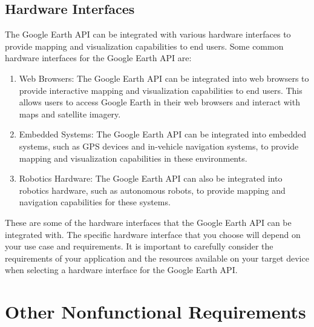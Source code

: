 \subsection{Hardware Interfaces}
The Google Earth API can be integrated with various hardware interfaces to provide mapping and visualization capabilities to end users. Some common hardware interfaces for the Google Earth API are:
\begin{enumerate}
\item Web Browsers: The Google Earth API can be integrated into web browsers to provide interactive mapping and visualization capabilities to end users. This allows users to access Google Earth in their web browsers and interact with maps and satellite imagery.
\item Embedded Systems: The Google Earth API can be integrated into embedded systems, such as GPS devices and in-vehicle navigation systems, to provide mapping and visualization capabilities in these environments.
\item Robotics Hardware: The Google Earth API can also be integrated into robotics hardware, such as autonomous robots, to provide mapping and navigation capabilities for these systems.
	
\end{enumerate}
These are some of the hardware interfaces that the Google Earth API can be integrated with. The specific hardware interface that you choose will depend on your use case and requirements. It is important to carefully consider the requirements of your application and the resources available on your target device when selecting a hardware interface for the Google Earth API.


	\section{Other Nonfunctional Requirements}
	
